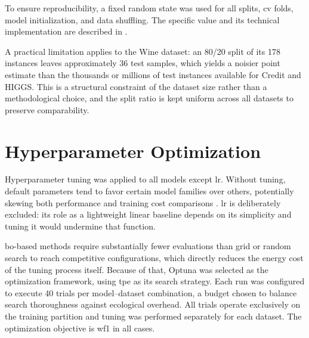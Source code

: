 To ensure reproducibility, a fixed random state was used for all splits, \gls{cv} folds, model initialization, and data shuffling. The specific value and its technical implementation are described in .

A practical limitation applies to the Wine dataset: an 80/20 split of its 178 instances leaves approximately 36 test samples, which yields a noisier point estimate than the thousands or millions of test instances available for Credit and HIGGS. This is a structural constraint of the dataset size rather than a methodological choice, and the split ratio is kept uniform across all datasets to preserve comparability.

\section{Hyperparameter Optimization}
\label{design_hyperparameter}
\label{implementation_tuning}

Hyperparameter tuning was applied to all models except \gls{lr}. Without tuning, default parameters tend to favor certain model families over others, potentially skewing both performance and training cost comparisons \cite{bagnallUseDefaultParameter2017}. \gls{lr} is deliberately excluded: its role as a lightweight linear baseline depends on its simplicity and tuning it would undermine that function.

\gls{bo}-based methods require substantially fewer evaluations than grid or random search to reach competitive configurations, which directly reduces the energy cost of the tuning process itself. Because of that, Optuna was selected as the optimization framework, using \gls{tpe} as its search strategy. Each run was configured to execute 40 trials per model--dataset combination, a budget chosen to balance search thoroughness against ecological overhead. All trials operate exclusively on the training partition and tuning was performed separately for each dataset. The optimization objective is \gls{wf1} in all cases.

